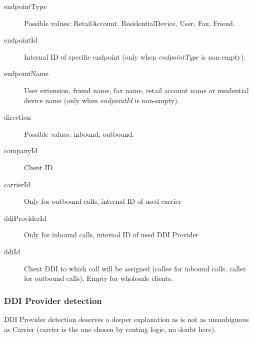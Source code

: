 \documentclass[letterpaper,10pt,english]{sphinxmanual}
\begin{document}
\begin{description}
\item[{endpointType}] \leavevmode{}\label{administration_portal/brand/calls/call_csv_schedulers:term-endpointtype}
Possible values: RetailAccount, ResidentialDevice, User, Fax, Friend.

\item[{endpointId}] \leavevmode{}\label{administration_portal/brand/calls/call_csv_schedulers:term-endpointid}
Internal ID of specific endpoint (only when \emph{endpointType} is non-empty).

\item[{endpointName}] \leavevmode{}\label{administration_portal/brand/calls/call_csv_schedulers:term-endpointname}
User extension, friend name, fax name, retail account name or residential device name (only when \emph{endpointId} is non-empty).

\item[{direction}] \leavevmode{}\label{administration_portal/brand/calls/call_csv_schedulers:term-27}
Possible values: inbound, outbound.

\item[{companyId}] \leavevmode{}\label{administration_portal/brand/calls/call_csv_schedulers:term-companyid}
Client ID

\item[{carrierId}] \leavevmode{}\label{administration_portal/brand/calls/call_csv_schedulers:term-carrierid}
Only for outbound calls, internal ID of used carrier

\item[{ddiProviderId}] \leavevmode{}\label{administration_portal/brand/calls/call_csv_schedulers:term-ddiproviderid}
Only for inbound calls, internal ID of used DDI Provider

\item[{ddiId}] \leavevmode{}\label{administration_portal/brand/calls/call_csv_schedulers:term-ddiid}
Client DDI to which call will be assigned (callee for inbound calls, caller for outbound calls). Empty for
wholesale clients.

\end{description}


\subsubsection{DDI Provider detection}
\label{administration_portal/brand/calls/call_csv_schedulers:ddi-provider-detection}
DDI Provider detection deserves a deeper explanation as is not as unambiguous as Carrier (carrier is the one chosen by
routing logic, no doubt here).
\end{document}
